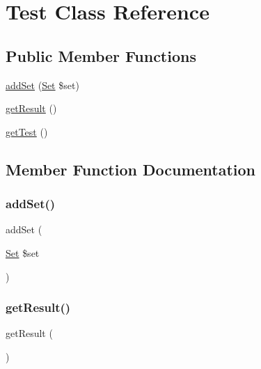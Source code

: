 \hypertarget{class_classes_1_1_test_1_1_test}{}\section{Test Class Reference}
\label{class_classes_1_1_test_1_1_test}
\subsection*{Public Member Functions}
\begin{DoxyCompactItemize}
\item 
\hyperlink{class_classes_1_1_test_1_1_test_ae6708de96ea5a340ae2bb47f73c1b990}{add\+Set} (\hyperlink{class_classes_1_1_test_1_1_set}{Set} \$set)
\item 
\hyperlink{class_classes_1_1_test_1_1_test_ae077eb8a032a325ceb939bfabfa5f472}{get\+Result} ()
\item 
\hyperlink{class_classes_1_1_test_1_1_test_a9af17f39a73d4e6194209ba95f557e0a}{get\+Test} ()
\end{DoxyCompactItemize}


\subsection{Member Function Documentation}
\mbox{\label{class_classes_1_1_test_1_1_test_ae6708de96ea5a340ae2bb47f73c1b990}} 
\subsubsection{\texorpdfstring{add\+Set()}{addSet()}}
{\footnotesize\ttfamily add\+Set (\begin{DoxyParamCaption}\item[{\hyperlink{class_classes_1_1_test_1_1_set}{Set}}]{\$set }\end{DoxyParamCaption})}

\mbox{\label{class_classes_1_1_test_1_1_test_ae077eb8a032a325ceb939bfabfa5f472}} 
\subsubsection{\texorpdfstring{get\+Result()}{getResult()}}
{\footnotesize\ttfamily get\+Result (\begin{DoxyParamCaption}{ }\end{DoxyParamCaption})}

